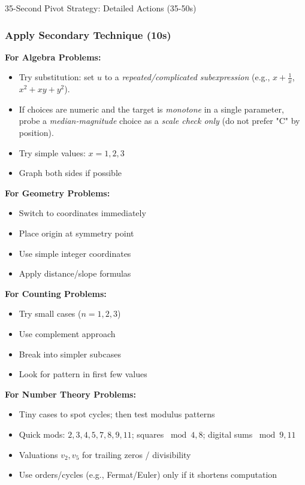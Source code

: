 \documentclass{article}
\begin{document}
\begin{classifybox}{35-Second Pivot Strategy: Detailed Actions (35-50s)}
\subsubsection{Apply Secondary Technique (10s)}
{\footnotesize\textcolor{timegreen}{}}

\textbf{For Algebra Problems:}
\begin{itemize}[nosep]
\item Try substitution: set $u$ to a \emph{repeated/complicated subexpression} (e.g., $x+\frac{1}{x}$, $x^2+xy+y^2$).
\item If choices are numeric and the target is \emph{monotone} in a single parameter, probe a \emph{median-magnitude} choice as a \emph{scale check only} (do not prefer "C" by position).
\item Try simple values: $x = 1, 2, 3$
\item Graph both sides if possible
\end{itemize}

\textbf{For Geometry Problems:}
\begin{itemize}[nosep]
\item Switch to coordinates immediately
\item Place origin at symmetry point
\item Use simple integer coordinates
\item Apply distance/slope formulas
\end{itemize}

\textbf{For Counting Problems:}
\begin{itemize}[nosep]
\item Try small cases ($n = 1, 2, 3$)
\item Use complement approach
\item Break into simpler subcases
\item Look for pattern in first few values
\end{itemize}

\textbf{For Number Theory Problems:}
\begin{itemize}[nosep]
\item Tiny cases to spot cycles; then test modulus patterns
\item Quick mods: \(2,3,4,5,7,8,9,11\); squares \(\bmod 4,8\); digital sums \(\bmod 9,11\)
\item Valuations \(v_2,v_5\) for trailing zeros / divisibility
\item Use orders/cycles (e.g., Fermat/Euler) only if it shortens computation
\end{itemize}


\end{classifybox}
\end{document}
